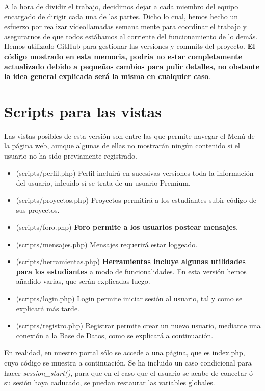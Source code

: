 \documentclass[12pt]{report}
\begin{document}
A la hora de dividir el trabajo, decidimos dejar a cada miembro del equipo encargado de dirigir cada una de las partes. Dicho lo cual, hemos hecho un esfuerzo por realizar videollamadas semanalmente para coordinar el trabajo y asegurarnos de que todos estábamos al corriente del funcionamiento de lo demás. Hemos utilizado GitHub para gestionar las versiones y commits del proyecto. \textbf{El código mostrado en esta memoria, podría no estar completamente actualizado debido a pequeños cambios para pulir detalles, no obstante la idea general explicada será la misma en cualquier caso}.
\newpage
\section{Scripts para las vistas}
Las vistas posibles de esta versión son entre las que permite navegar el Menú de la página web, aunque algunas de ellas no mostrarán ningún contenido si el usuario no ha sido previamente registrado.
\begin{itemize}
    \item (scripts/perfil.php) Perfil incluirá en sucesivas versiones toda la información del usuario, inlcuido si se trata de un usuario Premium.
    \item (scripts/proyectos.php) Proyectos permitirá a los estudiantes subir código de sus proyectos.
    \item (scripts/foro.php) \textbf{Foro permite a los usuarios postear mensajes}.
    \item (scripts/mensajes.php) Mensajes requerirá estar loggeado.
    \item (scripts/herramientas.php) \textbf{Herramientas incluye algunas utilidades para los estudiantes} a modo de funcionalidades. En esta versión hemos añadido varias, que serán explicadas luego.
    \item (scripts/login.php) Login permite iniciar sesión al usuario, tal y como se explicará más tarde. 
    \item (scripts/registro.php) Registrar permite crear un nuevo usuario, mediante una conexión a la Base de Datos, como se explicará a continuación.
\end{itemize}

En realidad, en nuestro portal sólo se accede a una página, que es index.php, cuyo código se muestra a continuación. Se ha incluido un caso condicional para hacer \textit{session\_start()}, para que en el caso que el usuario se acabe de conectar ó su sesión haya caducado, se puedan restaurar las variables globales.
\end{document}
